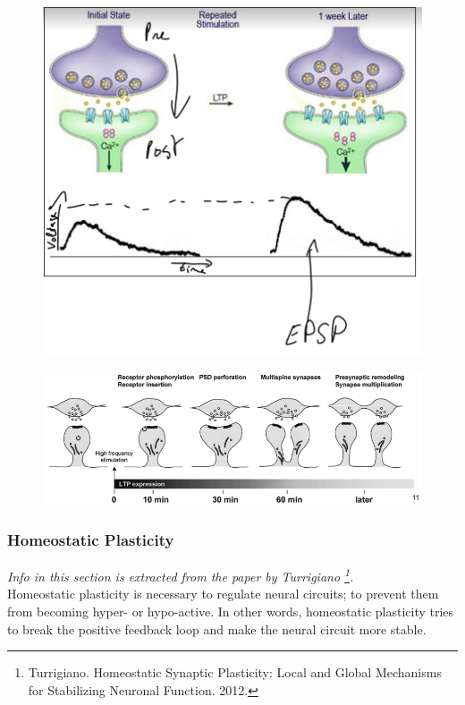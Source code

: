 \documentclass[main]{subfiles}
\begin{document}
\begin{figure}[H]
    \centering
    \includegraphics[width=.6\textwidth]{03_PlasticityInTheBrain/figures/pasted_image_1.png}
    \caption{}
    \label{fig:syn_plast1}
\end{figure}

\begin{figure}[H]
    \centering
    \includegraphics[width=.8\textwidth]{03_PlasticityInTheBrain/figures/pasted_image_2.png}
    \caption{}
    \label{fig:syn_plast1}
\end{figure}


\subsubsection{Homeostatic Plasticity}
\textit{Info in this section is extracted from the paper by Turrigiano \footnote{Turrigiano. Homeostatic Synaptic Plasticity: Local and Global Mechanisms for Stabilizing Neuronal Function. 2012.}.}\\

\noindent
Homeostatic plasticity is necessary to regulate neural circuits; to prevent them from becoming hyper- or hypo-active. In other words, homeostatic plasticity tries to break the positive feedback loop and make the neural circuit more stable. \\
\end{document}
